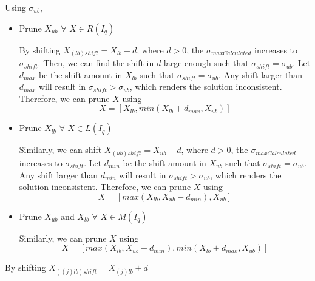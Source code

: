 \documentclass[a4paper,12pt]{article}
\begin{document}
Using $\sigma_{ub}$, 
\begin{itemize}
\item Prune  $X_{ub}$ $\forall$ $X \in R(I_{q})$ 

By shifting $X_{(lb)shift}=X_{lb} + d$, where $d>0$, the $\sigma_{maxCalculated}$ increases to $\sigma_{shift}$. Then, we can find the shift in $d$ large enough such that $\sigma_{shift}=\sigma_{ub}$. Let $d_{max}$ be the shift amount in $X_{lb}$ such that $\sigma_{shift}=\sigma_{ub}$. Any shift larger than $d_{max}$ will result in $\sigma_{shift} > \sigma_{ub}$, which renders the solution inconsistent. Therefore, we can prune $X$ using 
\begin{equation}
\label{PRUNERXSPECIFIC} X=[X_{lb}, min(X_{lb}+d_{max},X_{ub})]
\end{equation}

\item Prune  $X_{lb}$ $\forall$ $X \in L(I_{q})$

Similarly, we can shift $X_{(ub)shift}=X_{ub} - d$, where $d>0$, the $\sigma_{maxCalculated}$ increases to $\sigma_{shift}$. Let $d_{min}$ be the shift amount in $X_{ub}$ such that $\sigma_{shift}=\sigma_{ub}$. Any shift larger than $d_{min}$ will result in $\sigma_{shift} > \sigma_{ub}$, which renders the solution inconsistent. Therefore, we can prune $X$ using 
\begin{equation}
\label{PRUNELXSPECIFIC}
X=[max(X_{lb}, X_{ub}-d_{min}),X_{ub}]
\end{equation}

\item Prune $X_{ub}$ and $X_{lb}$ $\forall$ $X \in M(I_{q})$

Similarly, we can prune $X$ using 
\begin{equation}
\label{PRUNEMXSPECIFIC}
X=[max(X_{lb}, X_{ub}-d_{min}),min(X_{lb}+d_{max},X_{ub})]
\end{equation}
\end{itemize} 

By shifting $X_{((j)lb)shift}=X_{(j)lb} + d$
\end{document}
